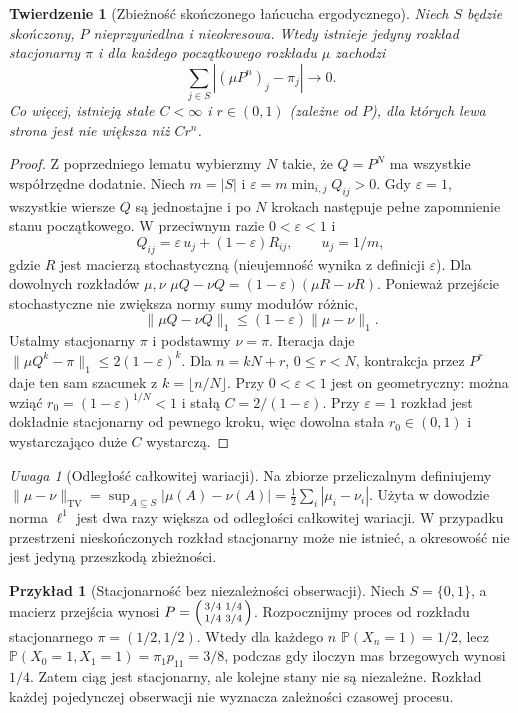 \documentclass[11pt,a4paper,oneside]{report}
\numberwithin{equation}{chapter}
\theoremstyle{plain}
\newtheorem{twierdzenie}{Twierdzenie}[chapter]
\theoremstyle{definition}
\newtheorem{przyklad}{Przykład}[chapter]
\theoremstyle{remark}
\newtheorem{uwaga}{Uwaga}[chapter]
\newcommand{\Prob}{\mathbb{P}}
\begin{document}
\begin{twierdzenie}[Zbieżność skończonego łańcucha ergodycznego]
Niech $S$ będzie skończony, $P$ nieprzywiedlna
i nieokresowa. Wtedy istnieje jedyny rozkład
stacjonarny $\pi$ i dla każdego początkowego
rozkładu $\mu$ zachodzi
\[
\sum_{j\in S}|(\mu P^n)_j-\pi_j|\longrightarrow0.
\]
Co więcej, istnieją stałe $C<\infty$ i $r\in(0,1)$
(zależne od $P$), dla których lewa strona jest
nie większa niż $Cr^n$.
\end{twierdzenie}
\begin{proof}
Z poprzedniego lematu wybierzmy $N$ takie,
że $Q=P^N$ ma wszystkie współrzędne dodatnie.
Niech $m=|S|$ i $\varepsilon=m\min_{i,j}Q_{ij}>0$.
Gdy $\varepsilon=1$, wszystkie wiersze $Q$ są
jednostajne i po $N$ krokach następuje pełne
zapomnienie stanu początkowego.
W przeciwnym razie $0<\varepsilon<1$ i
\[
Q_{ij}=\varepsilon\,u_j+(1-\varepsilon)R_{ij},
\qquad u_j=1/m,
\]
gdzie $R$ jest macierzą stochastyczną (nieujemność
wynika z definicji $\varepsilon$).
Dla dowolnych rozkładów $\mu,\nu$
$\mu Q-\nu Q=(1-\varepsilon)(\mu R-\nu R)$.
Ponieważ przejście stochastyczne nie zwiększa
normy sumy modułów różnic,
\[
\|\mu Q-\nu Q\|_1
\leq(1-\varepsilon)\|\mu-\nu\|_1.
\]
Ustalmy stacjonarny $\pi$ i podstawmy $\nu=\pi$.
Iteracja daje
$\|\mu Q^k-\pi\|_1\leq2(1-\varepsilon)^k$.
Dla $n=kN+r$, $0\leq r<N$, kontrakcja przez
$P^r$ daje ten sam szacunek z $k=\lfloor n/N\rfloor$.
Przy $0<\varepsilon<1$ jest on geometryczny:
można wziąć $r_0=(1-\varepsilon)^{1/N}<1$
i stałą $C=2/(1-\varepsilon)$.
Przy $\varepsilon=1$ rozkład jest dokładnie
stacjonarny od pewnego kroku, więc dowolna stała
$r_0\in(0,1)$ i wystarczająco duże $C$ wystarczą.
\end{proof}

\begin{uwaga}[Odległość całkowitej wariacji]
Na zbiorze przeliczalnym definiujemy
$\|\mu-\nu\|_{\mathrm{TV}}=\sup_{A\subseteq S}
|\mu(A)-\nu(A)|=\frac12\sum_i|\mu_i-\nu_i|$.
Użyta w dowodzie norma $\ell^1$ jest dwa razy
większa od odległości całkowitej wariacji.
W przypadku przestrzeni nieskończonych rozkład
stacjonarny może nie istnieć, a okresowość nie
jest jedyną przeszkodą zbieżności.
\end{uwaga}


\begin{przyklad}[Stacjonarność bez niezależności obserwacji]
Niech $S=\{0,1\}$, a macierz przejścia wynosi
$P=\begin{psmallmatrix}3/4&1/4\\1/4&3/4\end{psmallmatrix}$.
Rozpocznijmy proces od rozkładu stacjonarnego
$\pi=(1/2,1/2)$. Wtedy dla każdego $n$
$\Prob(X_n=1)=1/2$, lecz
$\Prob(X_0=1,X_1=1)=\pi_1p_{11}=3/8$,
podczas gdy iloczyn mas brzegowych wynosi $1/4$.
Zatem ciąg jest stacjonarny, ale kolejne stany
nie są niezależne. Rozkład każdej pojedynczej obserwacji
nie wyznacza zależności czasowej procesu.
\end{przyklad}
\end{document}
